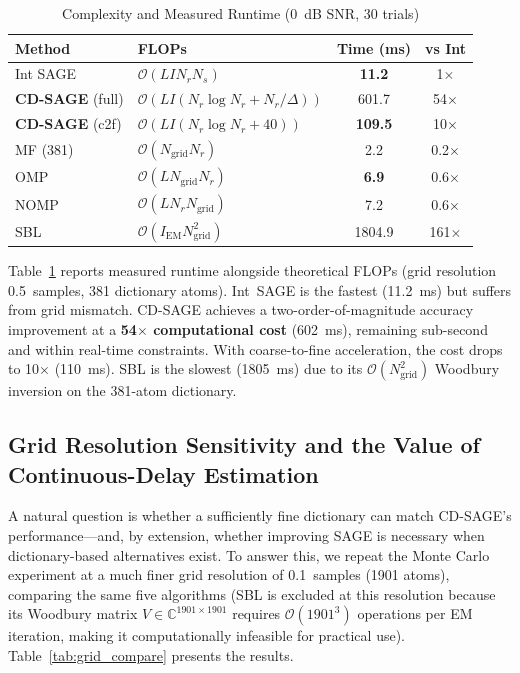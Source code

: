 \documentclass[journal]{IEEEtran}
\newcommand{\bigO}{\mathcal{O}}
\begin{document}
\begin{table}[t]
\centering
\caption{Complexity and Measured Runtime (0~dB SNR, 30 trials)}
\label{tab:complexity}
\footnotesize
\begin{tabular}{@{}l>{\raggedright\arraybackslash}p{2.9cm}cc@{}}
\toprule
Method & FLOPs & Time (ms) & vs Int \\
\midrule
Int SAGE & $\bigO(L I N_r N_s)$ & \textbf{11.2} & 1$\times$ \\
\textbf{CD-SAGE} (full) & $\bigO(L I (N_r \log N_r + N_r/\Delta))$ & 601.7 & 54$\times$ \\
\textbf{CD-SAGE} (c2f) & $\bigO(L I (N_r \log N_r + 40))$ & \textbf{109.5} & 10$\times$ \\
MF (381) & $\bigO(N_{\text{grid}} N_r)$ & 2.2 & 0.2$\times$ \\
OMP & $\bigO(L N_{\text{grid}} N_r)$ & \textbf{6.9} & 0.6$\times$ \\
NOMP & $\bigO(L N_r N_{\text{grid}})$ & 7.2 & 0.6$\times$ \\
SBL & $\bigO(I_{\text{EM}} N_{\text{grid}}^2)$ & 1804.9 & 161$\times$ \\
\bottomrule
\end{tabular}
\end{table}

Table~\ref{tab:complexity} reports measured runtime alongside theoretical FLOPs (grid resolution 0.5~samples, 381 dictionary atoms). Int~SAGE is the fastest (\SI{11.2}{ms}) but suffers from grid mismatch. CD-SAGE achieves a two-order-of-magnitude accuracy improvement at a \textbf{54$\times$ computational cost} (\SI{602}{ms}), remaining sub-second and within real-time constraints. With coarse-to-fine acceleration, the cost drops to 10$\times$ (\SI{110}{ms}). SBL is the slowest (\SI{1805}{ms}) due to its $\bigO(N_{\text{grid}}^2)$ Woodbury inversion on the 381-atom dictionary.

\subsection{Grid Resolution Sensitivity and the Value of Continuous-Delay Estimation}

A natural question is whether a sufficiently fine dictionary can match CD-SAGE's performance---and, by extension, whether improving SAGE is necessary when dictionary-based alternatives exist. To answer this, we repeat the Monte Carlo experiment at a much finer grid resolution of 0.1~samples (1901 atoms), comparing the same five algorithms (SBL is excluded at this resolution because its Woodbury matrix $V \in \mathbb{C}^{1901\times 1901}$ requires $\mathcal{O}(1901^3)$ operations per EM iteration, making it computationally infeasible for practical use). Table~\ref{tab:grid_compare} presents the results.
\end{document}

